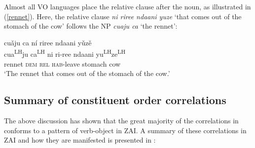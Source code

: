 Almost all VO languages place the relative clause after the noun, as illustrated in (\ref{rennet}). Here, the relative clause \textit{ni riree ndaani yuze} `that comes out of the stomach of the cow' follows the NP \textit{cuaju ca} `the rennet':

\ea\label{rennet}
\glll cu\v{a}ju ca n\'{i} riree ndaani y\v{u}z\v{e} \\
cua\textsuperscript{LH}ju ca\textsuperscript{LH} ni ri-ree ndaani yu\textsuperscript{LH}ze\textsuperscript{LH} \\
rennet \textsc{dem} \textsc{rel} \textsc{hab}-leave stomach cow \\
\glt `The rennet that comes out of the stomach of the cow.'
\z



\subsection{Summary of constituent order correlations}

The above discussion has shown that the great majority of the  correlations in  conforms to a pattern of verb-object in ZAI. A summary of these correlations in ZAI and how they are manifested is presented in :

